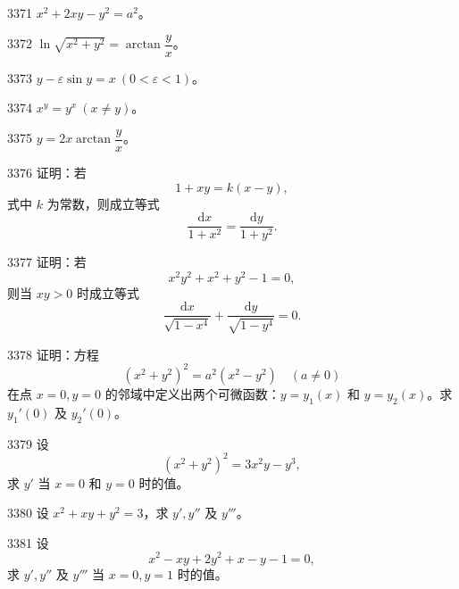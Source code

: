 
\begin{prob}[S]{3371}
$x^2 + 2xy - y^2 = a^2$。
\end{prob}

\begin{prob}[S]{3372}
$\ln\sqrt{x^2 + y^2} = \arctan\dfrac{y}{x}$。
\end{prob}

\begin{prob}[S]{3373}
$y - \varepsilon\sin y = x\ (0 < \varepsilon < 1)$。
\end{prob}

\begin{prob}[S]{3374}
$x^y = y^x\ (x \neq y)$。
\end{prob}

\begin{prob}[S]{3375}
$y = 2x\arctan\dfrac{y}{x}$。
\end{prob}

\begin{prob}[M]{3376}
证明：若
\[
1 + xy = k(x - y),
\]
式中 $k$ 为常数，则成立等式
\[
\frac{\mathrm{d}x}{1 + x^2} = \frac{\mathrm{d}y}{1 + y^2}.
\]
\end{prob}

\begin{prob}[M]{3377}
证明：若
\[
x^2 y^2 + x^2 + y^2 - 1 = 0,
\]
则当 $xy > 0$ 时成立等式
\[
\frac{\mathrm{d}x}{\sqrt{1 - x^4}} + \frac{\mathrm{d}y}{\sqrt{1 - y^4}} = 0.
\]
\end{prob}

\begin{prob}[M]{3378}
证明：方程
\[
(x^2 + y^2)^2 = a^2(x^2 - y^2) \quad (a \neq 0)
\]
在点 $x = 0, y = 0$ 的邻域中定义出两个可微函数：$y = y_1(x)$ 和 $y = y_2(x)$。求 $y_1'(0)$ 及 $y_2'(0)$。
\end{prob}

\begin{prob}[M]{3379}
设
\[
(x^2 + y^2)^2 = 3x^2 y - y^3,
\]
求 $y'$ 当 $x = 0$ 和 $y = 0$ 时的值。
\end{prob}

\begin{prob}[S]{3380}
设 $x^2 + xy + y^2 = 3$，求 $y', y''$ 及 $y'''$。
\end{prob}

\begin{prob}[M]{3381}
设
\[
x^2 - xy + 2y^2 + x - y - 1 = 0,
\]
求 $y', y''$ 及 $y'''$ 当 $x = 0, y = 1$ 时的值。
\end{prob}

